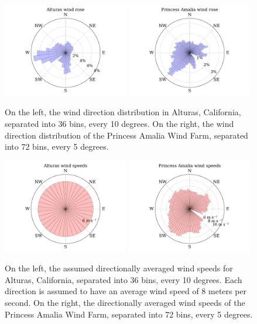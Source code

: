 \begin{figure}[htbp]
  \centering
  \includegraphics[width=0.49\textwidth]{Figures/alturas_rose.pdf}
  \includegraphics[width=0.49\textwidth]{Figures/amalia_rose.pdf}
  \caption{\label{wind_roses} On the left, the wind direction distribution in Alturas, California, separated into 36 bins, every 10 degrees. On the right, the wind direction distribution of the Princess Amalia Wind Farm, separated into 72 bins, every 5 degrees.}
\end{figure}

\begin{figure}[htbp]
  \centering
  \includegraphics[width=0.49\textwidth]{Figures/alturas_speeds.pdf}
  \includegraphics[width=0.49\textwidth]{Figures/amalia_speeds.pdf}
  \caption{\label{wind_speeds} On the left, the assumed directionally averaged wind speeds for Alturas, California, separated into 36 bins, every 10 degrees. Each direction is assumed to have an average wind speed of 8 meters per second. On the right, the directionally averaged wind speeds of the Princess Amalia Wind Farm, separated into 72 bins, every 5 degrees.}
\end{figure}


